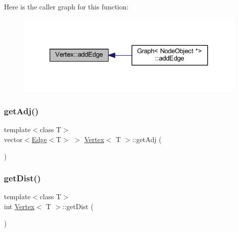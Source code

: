 Here is the caller graph for this function\+:
\nopagebreak
\begin{figure}[H]
\begin{center}
\leavevmode
\includegraphics[width=321pt]{class_vertex_ad0345b64511f76cbe93a767ec88642b2_icgraph}
\end{center}
\end{figure}
\mbox{\label{class_vertex_aa8f7822976771f28e9a37199bcab69aa}} 
\subsubsection{\texorpdfstring{get\+Adj()}{getAdj()}}
{\footnotesize\ttfamily template$<$class T$>$ \\
vector$<$\hyperlink{class_edge}{Edge}$<$T$>$ $>$ \hyperlink{class_vertex}{Vertex}$<$ T $>$\+::get\+Adj (\begin{DoxyParamCaption}{ }\end{DoxyParamCaption})\hspace{0.3cm}{\ttfamily [inline]}}

\mbox{\label{class_vertex_a74863c211c94a7a5d90e565318d1434d}} 
\subsubsection{\texorpdfstring{get\+Dist()}{getDist()}}
{\footnotesize\ttfamily template$<$class T$>$ \\
int \hyperlink{class_vertex}{Vertex}$<$ T $>$\+::get\+Dist (\begin{DoxyParamCaption}{ }\end{DoxyParamCaption})\hspace{0.3cm}{\ttfamily [inline]}}

